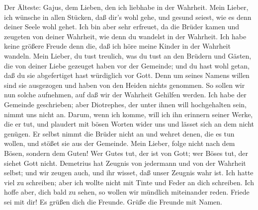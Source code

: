 Der Älteste: Gajus, dem Lieben, den ich liebhabe in der
Wahrheit.  Mein Lieber, ich wünsche in allen Stücken, daß
dir's wohl gehe, und gesund seiest, wie es denn deiner Seele wohl gehet.
 Ich bin aber sehr erfreuet, da die Brüder kamen und
zeugeten von deiner Wahrheit, wie denn du wandelst in der Wahrheit.
 Ich habe keine größere Freude denn die, daß ich höre meine
Kinder in der Wahrheit wandeln.  Mein Lieber, du tust
treulich, was du tust an den Brüdern und Gästen,  die von
deiner Liebe gezeuget haben vor der Gemeinde; und du hast wohl getan,
daß du sie abgefertiget hast würdiglich vor Gott.  Denn um
seines Namens willen sind sie ausgezogen und haben von den Heiden nichts
genommen.  So sollen wir nun solche aufnehmen, auf daß wir
der Wahrheit Gehilfen werden.  Ich habe der Gemeinde
geschrieben; aber Diotrephes, der unter ihnen will hochgehalten sein,
nimmt uns nicht an.  Darum, wenn ich komme, will ich ihn
erinnern seiner Werke, die er tut, und plaudert mit bösen Worten wider
uns und lässet sich an dem nicht genügen. Er selbst nimmt die Brüder
nicht an und wehret denen, die es tun wollen, und stößet sie aus der
Gemeinde.  Mein Lieber, folge nicht nach dem Bösen, sondern
dem Guten! Wer Gutes tut, der ist von Gott; wer Böses tut, der siehet
Gott nicht.  Demetrius hat Zeugnis von jedermann und von
der Wahrheit selbst; und wir zeugen auch, und ihr wisset, daß unser
Zeugnis wahr ist.  Ich hatte viel zu schreiben; aber ich
wollte nicht mit Tinte und Feder an dich schreiben.  Ich
hoffe aber, dich bald zu sehen, so wollen wir mündlich miteinander
reden.  Friede sei mit dir! Es grüßen dich die Freunde.
Grüße die Freunde mit Namen.
